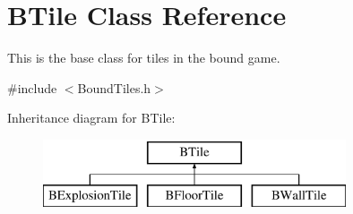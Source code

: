 \hypertarget{class_b_tile}{\section{\-B\-Tile \-Class \-Reference}
\label{class_b_tile}
}


\-This is the base class for tiles in the bound game.  




{\ttfamily \#include $<$\-Bound\-Tiles.\-h$>$}

\-Inheritance diagram for \-B\-Tile\-:\begin{figure}[H]
\begin{center}
\leavevmode
\includegraphics[height=2.000000cm]{class_b_tile}
\end{center}
\end{figure}
